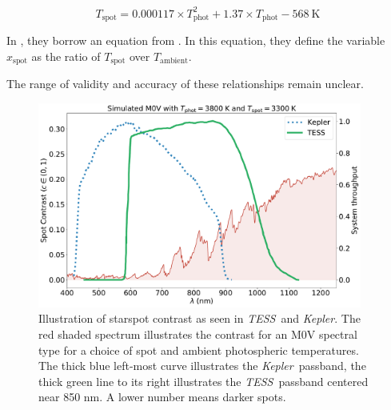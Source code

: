 \documentclass[twocolumn]{aastex631}
\newcommand{\tess}{{\it TESS}}
\newcommand{\kepler}{{\it Kepler}}
\begin{document}
\begin{equation}
  T_{\mathrm{spot}} = 0.000117 \times T_{\mathrm{phot}}^2 + 1.37 \times T_{\mathrm{phot}} - 568 ~\mathrm{K}
  \label{eq:TspotFang}
\end{equation}

In \citet{2022arXiv220910549C}, they borrow an equation from \citet{somers151}. In this equation, they define the variable $x_\mathrm{spot}$ as the ratio of $T_\mathrm{spot}$ over $T_\mathrm{ambient}$.

The range of validity and accuracy of these relationships remain unclear.




\begin{figure}[hbt!]
  \includegraphics[width=0.95\textwidth]{figures/contrast_spectrum2.pdf}
  \caption{Illustration of starspot contrast as seen in \tess\ and \kepler. The red shaded spectrum illustrates the contrast for an M0V spectral type for a choice of spot and ambient photospheric temperatures. The thick blue left-most curve illustrates the \kepler\ passband, the thick green line to its right illustrates the \tess\ passband centered near 850 nm.  A lower number means darker spots.  }
  \label{fig:filtercurve}
\end{figure}
\end{document}

